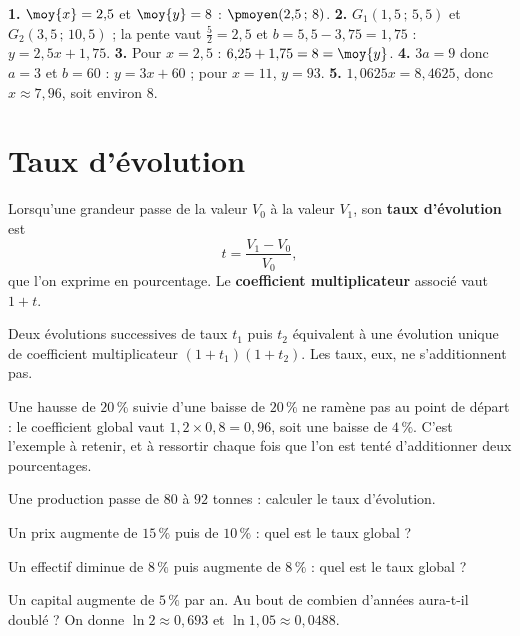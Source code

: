 \begin{corrige}
\textbf{1.} $\moy{x} = 2{,}5$ et $\moy{y} = 8$ : $\pmoyen(2{,}5\,;\,8)$.
\textbf{2.} $G_{1}(1{,}5\,;\,5{,}5)$ et $G_{2}(3{,}5\,;\,10{,}5)$ ; la
pente vaut $\frac{5}{2} = 2{,}5$ et $b = 5{,}5-3{,}75 = 1{,}75$ :
$y = 2{,}5x+1{,}75$.
\textbf{3.} Pour $x = 2{,}5$ : $6{,}25+1{,}75 = 8 = \moy{y}$. \checkmark
\textbf{4.} $3a = 9$ donc $a = 3$ et $b = 60$ : $y = 3x+60$ ; pour
$x = 11$, $y = 93$.
\textbf{5.} $1{,}0625x = 8{,}4625$, donc $x \approx 7{,}96$, soit environ
$8$.
\end{corrige}

\section{Taux d'évolution}

\begin{definition}
Lorsqu'une grandeur passe de la valeur $V_{0}$ à la valeur $V_{1}$, son
\textbf{taux d'évolution} est
\[
  t = \frac{V_{1}-V_{0}}{V_{0}},
\]
que l'on exprime en pourcentage. Le \textbf{coefficient multiplicateur}
associé vaut $1+t$.
\end{definition}

\begin{propriete}
Deux évolutions successives de taux $t_{1}$ puis $t_{2}$ équivalent à une
évolution unique de coefficient multiplicateur
$\left(1+t_{1}\right)\left(1+t_{2}\right)$. Les taux, eux, ne s'additionnent
pas.
\end{propriete}

\begin{erreurclassique}
Une hausse de $20\,\%$ suivie d'une baisse de $20\,\%$ ne ramène pas au
point de départ : le coefficient global vaut
$1{,}2\times0{,}8 = 0{,}96$, soit une baisse de $4\,\%$. C'est l'exemple à
retenir, et à ressortir chaque fois que l'on est tenté d'additionner deux
pourcentages.
\end{erreurclassique}

\begin{entrainement}[pourcentages]
\exo[\niveau{1}] Une production passe de $80$ à $92$ tonnes : calculer le
taux d'évolution.

\exo[\niveau{2}] Un prix augmente de $15\,\%$ puis de $10\,\%$ : quel est le
taux global ?

\exo[\niveau{2}] Un effectif diminue de $8\,\%$ puis augmente de $8\,\%$ :
quel est le taux global ?

\exo[\niveau{3}] Un capital augmente de $5\,\%$ par an. Au bout de combien
d'années aura-t-il doublé ? On donne $\ln 2 \approx 0{,}693$ et
$\ln 1{,}05 \approx 0{,}0488$.
\end{entrainement}

